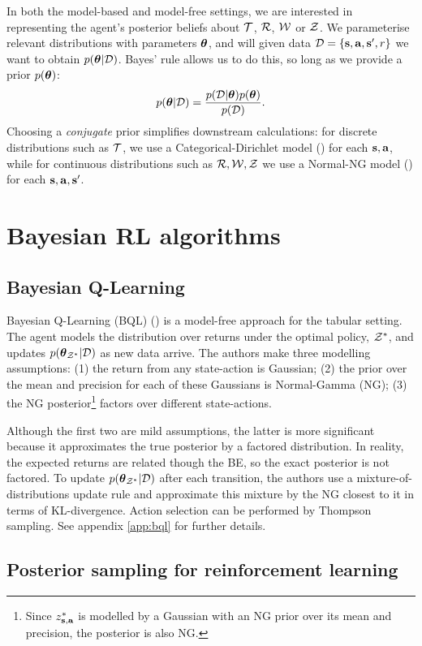 \documentclass{article}
\begin{document}
In both the model-based and model-free settings, we are interested in representing the agent's posterior beliefs about $\mathcal{T}$, $\mathcal{R}$, $\mathcal{W}$ or $\mathcal{Z}$. We parameterise relevant distributions with parameters $\boldsymbol{\theta}$, and will given data $\mathcal{D} = \{\mathbf{s}, \mathbf{a}, \mathbf{s}', r\}$ we want to obtain $p(\boldsymbol{\theta} | \mathcal{D})$. Bayes' rule allows us to do this, so long as we provide a prior $p(\boldsymbol{\theta})$:
\begin{align}
p(\boldsymbol{\theta} | \mathcal{D}) = \frac{p(\mathcal{D} | \boldsymbol{\theta}) p(\boldsymbol{\theta})}{p(\mathcal{D})}.
\end{align}
Choosing a \textit{conjugate} prior simplifies downstream calculations: for discrete distributions such as $\mathcal{T}$, we use a Categorical-Dirichlet model (\cite{murphy}) for each $\mathbf{s}, \mathbf{a}$, while for continuous distributions such as $\mathcal{R}, \mathcal{W}, \mathcal{Z}$ we use a Normal-NG model (\cite{bishop}) for each $\mathbf{s}, \mathbf{a}, \mathbf{s}'$.


\section{Bayesian RL algorithms}
\subsection{Bayesian Q-Learning}
Bayesian Q-Learning (BQL) (\cite{bqlearning}) is a model-free approach for the tabular setting. The agent models the distribution over returns under the optimal policy, $\mathcal{Z}^*$, and updates $p(\boldsymbol{\theta}_{\mathcal{Z}^*} | \mathcal{D})$ as new data arrive. The authors make three modelling assumptions: (1) the return from any state-action is Gaussian; (2) the prior over the mean and precision for each of these Gaussians is Normal-Gamma (NG); (3) the NG posterior\footnote{Since $z^*_{\mathbf{s}, \mathbf{a}}$ is modelled by a Gaussian with an NG prior over its mean and precision, the posterior is also NG.} factors over different state-actions.

Although the first two are mild assumptions, the latter is more significant because it approximates the true posterior by a factored distribution. In reality, the expected returns are related though the BE, so the exact posterior is not factored. To update $p(\boldsymbol{\theta}_{\mathcal{Z}^*} | \mathcal{D})$ after each transition, the authors use a mixture-of-distributions update rule and approximate this mixture by the NG closest to it in terms of KL-divergence. Action selection can be performed by Thompson sampling. See appendix \ref{app:bql} for further details.

\subsection{Posterior sampling for reinforcement learning}
\end{document}
